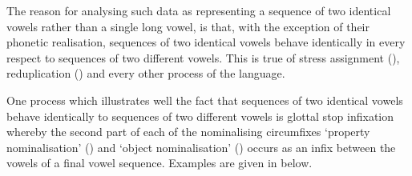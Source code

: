 \newpage
\begin{multicols}{2}
	\begin{exe}
			\label{as:Syl:fee}
			\label{as:Syl:fe:}
	\end{exe}
\end{multicols}

The reason for analysing such data as representing
a sequence of two identical vowels rather than a single long vowel,
is that, with the exception of their phonetic realisation,
sequences of two identical vowels behave identically
in every respect to sequences of two different vowels.
This is true of stress assignment (), reduplication ()
and every other process of the language.

One process which illustrates well the fact that 
sequences of two identical vowels behave
identically to sequences of two different vowels
is glottal stop infixation whereby the second part of each of
the nominalising circumfixes
 `property nominalisation' ()
and  `object nominalisation' ()
occurs as an infix between the vowels of a final vowel sequence.
Examples are given in  below.

